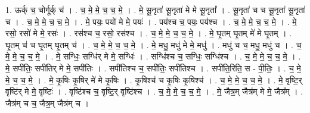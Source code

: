 \documentclass[17pt]{extarticle}
\begin{document}
1. ऊर्क् च॒ चोर्गूर्क् च॑ । . च॒ मे॒ मे॒ च॒ च॒ मे॒ । . मे॒ सू॒नृता॑ सू॒नृता॑ मे मे सू॒नृता᳚ । . सू॒नृता॑ च च सू॒नृता॑ सू॒नृता॑ च । . च॒ मे॒ मे॒ च॒ च॒ मे॒ । . मे॒ पयः॒ पयो॑ मे मे॒ पयः॑ । . पय॑श्च च॒ पयः॒ पय॑श्च । . च॒ मे॒ मे॒ च॒ च॒ मे॒ । . मे॒ रसो॒ रसो॑ मे मे॒ रसः॑ । . रस॑श्च च॒ रसो॒ रस॑श्च । . च॒ मे॒ मे॒ च॒ च॒ मे॒ । . मे॒ घृ॒तम् घृ॒तम् मे॑ मे घृ॒तम् । . घृ॒तम् च॑ च घृ॒तम् घृ॒तम् च॑ । . च॒ मे॒ मे॒ च॒ च॒ मे॒ । . मे॒ मधु॒ मधु॑ मे मे॒ मधु॑ । . मधु॑ च च॒ मधु॒ मधु॑ च । . च॒ मे॒ मे॒ च॒ च॒ मे॒ । . मे॒ सग्धिः॒ सग्धि॑र् मे मे॒ सग्धिः॑ । . सग्धि॑श्च च॒ सग्धिः॒ सग्धि॑श्च । . च॒ मे॒ मे॒ च॒ च॒ मे॒ । . मे॒ सपी॑तिः॒ सपी॑तिर् मे मे॒ सपी॑तिः । . सपी॑तिश्च च॒ सपी॑तिः॒ सपी॑तिश्च । . सपी॑ति॒रिति॒ स - पी॒तिः॒ । . च॒ मे॒ मे॒ च॒ च॒ मे॒ । . मे॒ कृ॒षिः कृ॒षिर् मे॑ मे कृ॒षिः । . कृ॒षिश्च॑ च कृ॒षिः कृ॒षिश्च॑ । . च॒ मे॒ मे॒ च॒ च॒ मे॒ । . मे॒ वृष्टि॒र् वृष्टि॑र् मे मे॒ वृष्टिः॑ । . वृष्टि॑श्च च॒ वृष्टि॒र् वृष्टि॑श्च । . च॒ मे॒ मे॒ च॒ च॒ मे॒ । . मे॒ जैत्र॒म् जैत्र॑म् मे मे॒ जैत्र᳚म् । . जैत्र॑म् च च॒ जैत्र॒म् जैत्र॑म् च । \newline
\end{document}
